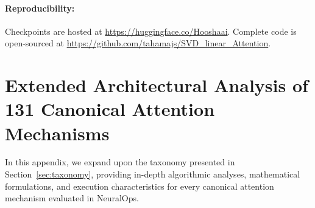 \documentclass{article}
\begin{document}
\paragraph{Reproducibility:} Checkpoints are hosted at \url{https://huggingface.co/Hooshaai}. Complete code is open-sourced at \url{https://github.com/tahamajs/SVD_linear_Attention}.




\clearpage
\appendix

\section{Extended Architectural Analysis of 131 Canonical Attention Mechanisms}
\label{app:extended_attentions}
In this appendix, we expand upon the taxonomy presented in Section~\ref{sec:taxonomy}, providing in-depth algorithmic analyses, mathematical formulations, and execution characteristics for every canonical attention mechanism evaluated in NeuralOps.
\end{document}
